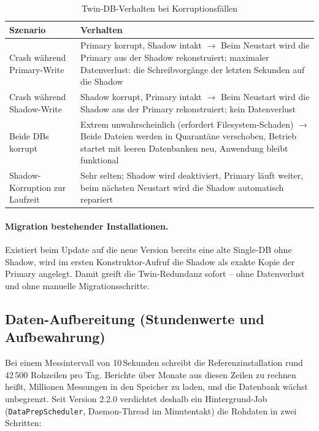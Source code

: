 \begin{table}[H]
\centering
\begin{tabular}{|p{5cm}|p{9cm}|}
\hline
\textbf{Szenario} & \textbf{Verhalten} \\
\hline
Crash während Primary-Write & Primary korrupt, Shadow intakt $\to$
  Beim Neustart wird die Primary aus der Shadow rekonstruiert; maximaler Datenverlust:
  die Schreibvorgänge der letzten Sekunden auf die Shadow \\
\hline
Crash während Shadow-Write & Shadow korrupt, Primary intakt $\to$
  Beim Neustart wird die Shadow aus der Primary rekonstruiert; kein Datenverlust \\
\hline
Beide DBs korrupt & Extrem unwahrscheinlich (erfordert Filesystem-Schaden) $\to$
  Beide Dateien werden in Quarantäne verschoben, Betrieb startet mit leeren
  Datenbanken neu, Anwendung bleibt funktional \\
\hline
Shadow-Korruption zur Laufzeit & Sehr selten; Shadow wird deaktiviert, Primary
  läuft weiter, beim nächsten Neustart wird die Shadow automatisch repariert \\
\hline
\end{tabular}
\caption{Twin-DB-Verhalten bei Korruptionsfällen}
\label{tab:twindb-szenarien}
\end{table}

\paragraph{Migration bestehender Installationen.} Existiert beim Update auf die neue
Version bereits eine alte Single-DB ohne Shadow, wird im ersten Konstruktor-Aufruf
die Shadow als exakte Kopie der Primary angelegt. Damit greift die Twin-Redundanz
sofort -- ohne Datenverlust und ohne manuelle Migrationsschritte.

\subsection{Daten-Aufbereitung (Stundenwerte und Aufbewahrung)}
\label{subsec:dataprep}

Bei einem Messintervall von 10\,Sekunden schreibt die Referenzinstallation rund 42\,500
Rohzeilen pro Tag. Berichte über Monate aus diesen Zeilen zu rechnen heißt, Millionen
Messungen in den Speicher zu laden, und die Datenbank wächst unbegrenzt. Seit Version 2.2.0
verdichtet deshalb ein Hintergrund-Job (\texttt{DataPrepScheduler}, Daemon-Thread im
Minutentakt) die Rohdaten in zwei Schritten:


